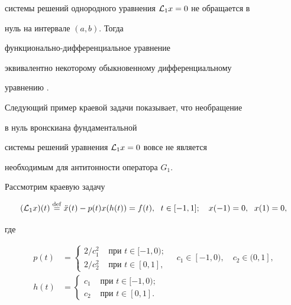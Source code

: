 системы решений однородного уравнения ${\cal L}_1 x=0$ не обращается в


нуль на интервале $(a,b)$. Тогда


функционально-дифференциальное уравнение


эквивалентно некоторому обыкновенному дифференциальному


уравнению \cite{AD}.





Следующий пример краевой задачи показывает, что необращение


в нуль вронскиана фундаментальной


системы решений уравнения ${\cal L}_1 x=0$ вовсе не является


необходимым для антитонности оператора $G_1$.





Рассмотрим краевую задачу


\begin{equation}


\label{1}


(\L_1x)(t)\df\Ddot


x(t)-p(t)x(h(t))=f(t),\ \; t\in[-1,1];\quad


x(-1)=0,\ \; x(1)=0,


\end{equation}


где


\begin{align*}


p(t)&=


\begin{cases}


2/{c^2_1}& \text{ при }t\in[-1,0);\\


{2}/{c^2_2}& \text{ при }t\in[0,1],


\end{cases}


\quad c_1\in[-1,0),\quad c_2\in(0,1],\\


%


h(t)&=


\begin{cases}


{c_1}& \text{ при }t\in[-1,0);\\


c_2& \text{ при }t\in[0,1].


\end{cases}


\end{align*}



